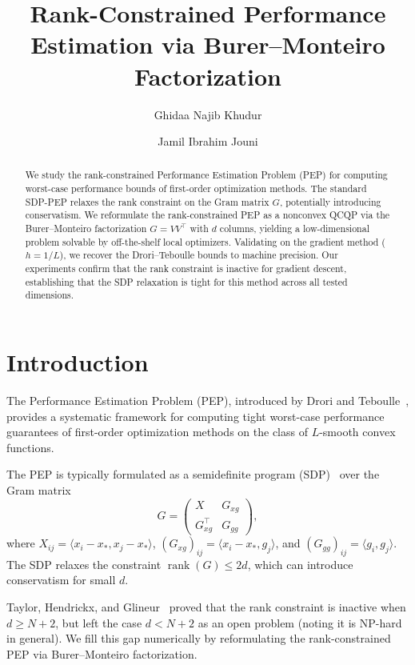 \documentclass[11pt]{article}
\title{Rank-Constrained Performance Estimation via Burer--Monteiro Factorization}
\author{Ghidaa Najib Khudur \and Jamil Ibrahim Jouni}
\date{}
\begin{document}
\maketitle

\begin{abstract}
We study the rank-constrained Performance Estimation Problem (PEP) for computing worst-case performance bounds of first-order optimization methods.
The standard SDP-PEP relaxes the rank constraint on the Gram matrix $G$, potentially introducing conservatism.
We reformulate the rank-constrained PEP as a nonconvex QCQP via the Burer--Monteiro factorization $G = VV^\top$ with $d$ columns, yielding a low-dimensional problem solvable by off-the-shelf local optimizers.
Validating on the gradient method ($h=1/L$), we recover the Drori--Teboulle bounds to machine precision.
Our experiments confirm that the rank constraint is inactive for gradient descent, establishing that the SDP relaxation is tight for this method across all tested dimensions.
\end{abstract}

\section{Introduction}

The Performance Estimation Problem (PEP), introduced by Drori and Teboulle~\cite{drori2014optimal}, provides a systematic framework for computing tight worst-case performance guarantees of first-order optimization methods on the class of $L$-smooth convex functions.

The PEP is typically formulated as a semidefinite program (SDP)~\cite{taylor2017smooth, taylor2019constructing} over the Gram matrix
\[
G = \begin{pmatrix} X & G_{xg} \\ G_{xg}^\top & G_{gg} \end{pmatrix},
\]
where $X_{ij} = \langle x_i - x_*, x_j - x_*\rangle$, $(G_{xg})_{ij} = \langle x_i - x_*, g_j\rangle$, and $(G_{gg})_{ij} = \langle g_i, g_j\rangle$.
The SDP relaxes the constraint $\operatorname{rank}(G) \leq 2d$, which can introduce conservatism for small $d$.

Taylor, Hendrickx, and Glineur~\cite{taylor2017smooth} proved that the rank constraint is inactive when $d \geq N+2$, but left the case $d < N+2$ as an open problem (noting it is NP-hard in general).
We fill this gap numerically by reformulating the rank-constrained PEP via Burer--Monteiro factorization.
\end{document}

